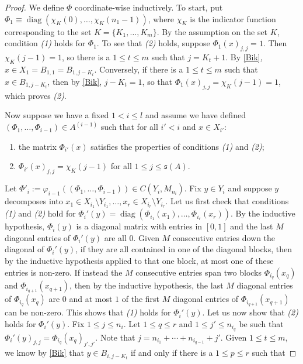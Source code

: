 \documentclass[12pt]{amsart}
\numberwithin{equation}{section}
\theoremstyle{definition}
\theoremstyle{remark}
\newcommand{\diag}{\operatorname{diag}}
\begin{document}
\begin{proof}
	We define $\Phi$ coordinate-wise inductively. To start, put $\Phi_{1}\equiv\diag(\chi_{K}(0),\ldots, \chi_{K}(n_{1}-1))$, where $\chi_{K}$ is the indicator function corresponding to the set $K=\{K_{1},\ldots,K_{m}\}$. By the assumption on the set $K$, condition \textit{(1)} holds for $\Phi_{1}$. To see that \textit{(2)} holds, suppose $\Phi_{1}(x)_{j,j}=1$. Then $\chi_{K}(j-1)=1$, so there is a $1\leq t\leq m$ such that $j=K_{t}+1$. By \autoref{Bik},  $x\in X_{1}= B_{1,1}=B_{1,j-K_{t}}$. Conversely, if there is a $1\leq t\leq m$ such that $x\in B_{1,j-K_{t}}$, then by \autoref{Bik}, $j-K_{t}=1$, so that $\Phi_{1}(x)_{j,j}=\chi_{K}(j-1)=1$, which proves \textit{(2)}. 
	
	Now suppose we have a fixed $1<i\leq  l $ and assume we have defined $(\Phi_{1},\ldots,\Phi_{i-1})\in A^{(i-1)}$ such that for all $i'<i$ and $x\in X_{i'}$: 
	\begin{enumerate}[label=(\Roman*)]
		\item the matrix $\Phi_{i'}(x)$ satisfies the properties of conditions \textit{(1)} and \textit{(2)};
		\item $\Phi_{i'}(x)_{j,j} = \chi_{K}(j-1)$ for all $1\leq j\leq \mathfrak{s}(A)$.
	\end{enumerate}
	Let $\Phi'_{i}:=\varphi_{i-1}((\Phi_{1},\ldots,\Phi_{i-1}))\in C(Y_{i},M_{n_{i}})$. Fix $y\in Y_{i}$ and suppose $y$ decomposes into $x_{1}\in X_{i_{1}}\setminus Y_{i_{1}},\ldots,x_{r}\in X_{i_{r}}\setminus Y_{i_{r}}$. Let us first check that conditions \textit{(1)} and \textit{(2)} hold for $\Phi_{i}'(y)=\diag(\Phi_{i_{1}}(x_{1}),\ldots,\Phi_{i_{r}}(x_{r}))$. By the inductive hypothesis, $\Phi_{i}(y)$ is a diagonal matrix with entries in $[0,1]$ and the last $M$ diagonal entries of $\Phi_{i}'(y)$ are all $0$. Given $M$ consecutive entries down the diagonal of $\Phi_{i}'(y)$, if they are all contained in one of the diagonal blocks, then by the inductive hypothesis applied to that one block, at most one of these entries is non-zero. If instead the $M$ consecutive entries span two blocks $\Phi_{i_{q}}(x_{q})$ and $\Phi_{i_{q+1}}(x_{q+1})$, then by the inductive hypothesis, the last $M$ diagonal entries of $\Phi_{i_{q}}(x_{q})$ are $0$ and at most $1$ of the first $M$ diagonal entries of $\Phi_{i_{q+1}}(x_{q+1})$ can be non-zero. This shows that \textit{(1)} holds for $\Phi_{i}'(y)$. Let us now show that \textit{(2)} holds for $\Phi_{i}'(y)$. Fix $1\leq j\leq n_{i}$. Let $1\leq q\leq r$ and $1\leq j'\leq n_{i_{q}}$ be such that $\Phi_{i}'(y)_{j,j}=\Phi_{i_{q}}(x_{q})_{j',j'}$. Note that $j=n_{i_{1}}+\cdots+n_{i_{q-1}}+j'$. Given $1\leq t\leq m$, we know by \autoref{Bik} that $y\in B_{i,j-K_{t}}$ if and only if there is a $1\leq p\leq r$ such that 

\end{proof}
\end{document}
